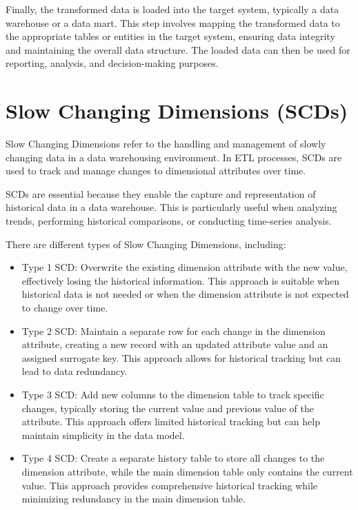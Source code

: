 Finally, the transformed data is loaded into the target system, typically a data warehouse or a data mart. This step involves mapping the transformed data to the appropriate tables or entities in the target system, ensuring data integrity and maintaining the overall data structure. The loaded data can then be used for reporting, analysis, and decision-making purposes.

\section{Slow Changing Dimensions (SCDs)}

Slow Changing Dimensions refer to the handling and management of slowly changing data in a data warehousing environment. In ETL processes, SCDs are used to track and manage changes to dimensional attributes over time.

SCDs are essential because they enable the capture and representation of historical data in a data warehouse. This is particularly useful when analyzing trends, performing historical comparisons, or conducting time-series analysis.

There are different types of Slow Changing Dimensions, including:

\begin{itemize}
	\item Type 1 SCD: Overwrite the existing dimension attribute with the new value, effectively losing the historical information. This approach is suitable when historical data is not needed or when the dimension attribute is not expected to change over time.
	
	\item Type 2 SCD: Maintain a separate row for each change in the dimension attribute, creating a new record with an updated attribute value and an assigned surrogate key. This approach allows for historical tracking but can lead to data redundancy.
	
	\item Type 3 SCD: Add new columns to the dimension table to track specific changes, typically storing the current value and previous value of the attribute. This approach offers limited historical tracking but can help maintain simplicity in the data model.
	
	\item Type 4 SCD: Create a separate history table to store all changes to the dimension attribute, while the main dimension table only contains the current value. This approach provides comprehensive historical tracking while minimizing redundancy in the main dimension table.
\end{itemize}